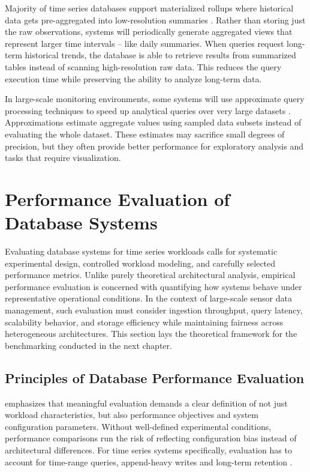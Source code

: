 Majority of time series databases support materialized rollups where historical data gets pre-aggregated into low-resolution summaries \citep{timescale_continuous_aggregates}. Rather than storing just the raw observations, systems will periodically generate aggregated views that represent larger time intervals -- like daily summaries. When queries request long-term historical trends, the database is able to retrieve results from summarized tables instead of scanning high-resolution raw data. This reduces the query execution time while preserving the ability to analyze long-term data.

In large-scale monitoring environments, some systems will use approximate query processing techniques to speed up analytical queries over very large datasets \citep{agarwal2013blinkdb}. Approximations estimate aggregate values using sampled data subsets instead of evaluating the whole dataset. These estimates may sacrifice small degrees of precision, but they often provide better performance for exploratory analysis and tasks that require visualization. 




\section{Performance Evaluation of Database Systems}
Evaluating database systems for time series workloads calls for systematic experimental design, controlled workload modeling, and carefully selected performance metrics. Unlike purely theoretical architectural analysis, empirical performance evaluation is concerned with quantifying how systems behave under representative operational conditions. In the context of large-scale sensor data management, such evaluation must consider ingestion throughput, query latency, scalability behavior, and storage efficiency while maintaining fairness across heterogeneous architectures. This section lays the theoretical framework for the benchmarking conducted in the next chapter.


\subsection{Principles of Database Performance Evaluation}

\citet{Taipalus_2024} emphasizes that meaningful evaluation demands a clear definition of not just workload characteristics, but also performance objectives and system configuration parameters. Without well-defined experimental conditions, performance comparisons run the risk of reflecting configuration bias instead of architectural differences. For time series systems specifically, evaluation has to account for time-range queries, append-heavy writes and long-term retention \citep{khelifati2023tsmbench}.

